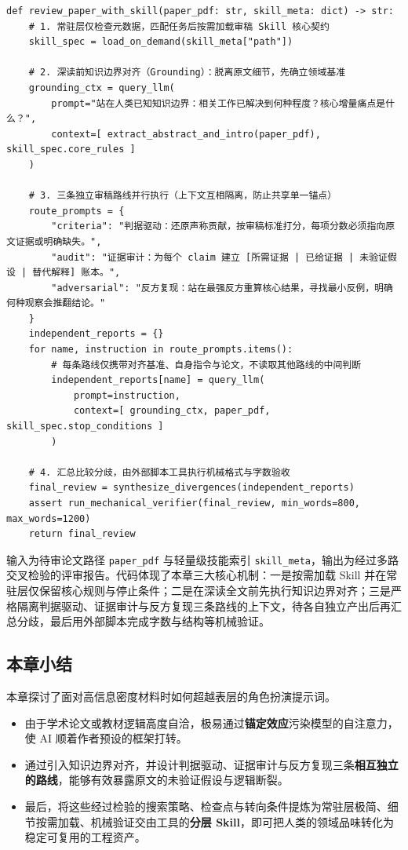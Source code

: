 \documentclass[UTF8,a4paper,11pt,fontset=fandol]{ctexart}
\begin{document}
\begin{lstlisting}[basicstyle={\ttfamily\small\linespread{1}\selectfont},captionpos=t,caption={三路独立审稿与分层 Skill 的上下文编排伪代码}]
def review_paper_with_skill(paper_pdf: str, skill_meta: dict) -> str:
    # 1. 常驻层仅检查元数据，匹配任务后按需加载审稿 Skill 核心契约
    skill_spec = load_on_demand(skill_meta["path"])

    # 2. 深读前知识边界对齐（Grounding）：脱离原文细节，先确立领域基准
    grounding_ctx = query_llm(
        prompt="站在人类已知知识边界：相关工作已解决到何种程度？核心增量痛点是什么？",
        context=[ extract_abstract_and_intro(paper_pdf), skill_spec.core_rules ]
    )

    # 3. 三条独立审稿路线并行执行（上下文互相隔离，防止共享单一锚点）
    route_prompts = {
        "criteria": "判据驱动：还原声称贡献，按审稿标准打分，每项分数必须指向原文证据或明确缺失。",
        "audit": "证据审计：为每个 claim 建立 [所需证据 | 已给证据 | 未验证假设 | 替代解释] 账本。",
        "adversarial": "反方复现：站在最强反方重算核心结果，寻找最小反例，明确何种观察会推翻结论。"
    }
    independent_reports = {}
    for name, instruction in route_prompts.items():
        # 每条路线仅携带对齐基准、自身指令与论文，不读取其他路线的中间判断
        independent_reports[name] = query_llm(
            prompt=instruction,
            context=[ grounding_ctx, paper_pdf, skill_spec.stop_conditions ]
        )

    # 4. 汇总比较分歧，由外部脚本工具执行机械格式与字数验收
    final_review = synthesize_divergences(independent_reports)
    assert run_mechanical_verifier(final_review, min_words=800, max_words=1200)
    return final_review
\end{lstlisting}

输入为待审论文路径 \texttt{paper\_pdf} 与轻量级技能索引 \texttt{skill\_meta}，输出为经过多路交叉检验的评审报告。代码体现了本章三大核心机制：一是按需加载 Skill 并在常驻层仅保留核心规则与停止条件；二是在深读全文前先执行知识边界对齐；三是严格隔离判据驱动、证据审计与反方复现三条路线的上下文，待各自独立产出后再汇总分歧，最后用外部脚本完成字数与结构等机械验证。

\subsection{本章小结}

本章探讨了面对高信息密度材料时如何超越表层的角色扮演提示词。

\begin{itemize}
\item 由于学术论文或教材逻辑高度自洽，极易通过\textbf{锚定效应}污染模型的自注意力，使 AI 顺着作者预设的框架打转。

\item 通过引入知识边界对齐，并设计判据驱动、证据审计与反方复现三条\textbf{相互独立的路线}，能够有效暴露原文的未验证假设与逻辑断裂。

\item 最后，将这些经过检验的搜索策略、检查点与转向条件提炼为常驻层极简、细节按需加载、机械验证交由工具的\textbf{分层 Skill}，即可把人类的领域品味转化为稳定可复用的工程资产。
\end{itemize}
\end{document}
